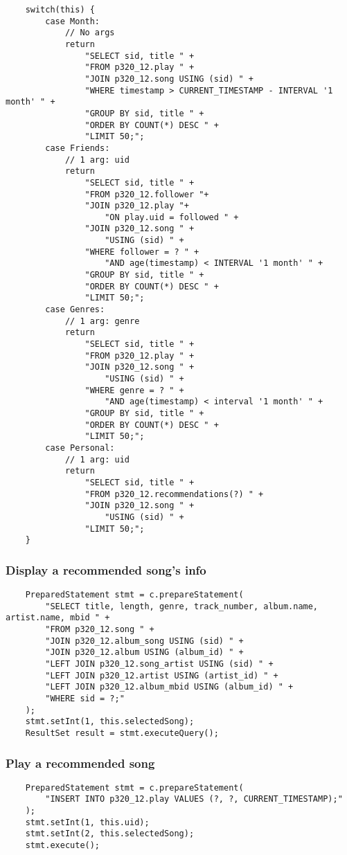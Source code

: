 \documentclass[12pt]{article}
\begin{document}
    \begin{lstlisting}
    switch(this) {
        case Month:
            // No args
            return
                "SELECT sid, title " +
                "FROM p320_12.play " +
                "JOIN p320_12.song USING (sid) " +
                "WHERE timestamp > CURRENT_TIMESTAMP - INTERVAL '1 month' " +
                "GROUP BY sid, title " +
                "ORDER BY COUNT(*) DESC " +
                "LIMIT 50;";
        case Friends:
            // 1 arg: uid
            return
                "SELECT sid, title " +
                "FROM p320_12.follower "+
                "JOIN p320_12.play "+
                    "ON play.uid = followed " +
                "JOIN p320_12.song " +
                    "USING (sid) " +
                "WHERE follower = ? " +
                    "AND age(timestamp) < INTERVAL '1 month' " +
                "GROUP BY sid, title " +
                "ORDER BY COUNT(*) DESC " +
                "LIMIT 50;";
        case Genres:
            // 1 arg: genre
            return
                "SELECT sid, title " +
                "FROM p320_12.play " +
                "JOIN p320_12.song " +
                    "USING (sid) " +
                "WHERE genre = ? " +
                    "AND age(timestamp) < interval '1 month' " +
                "GROUP BY sid, title " +
                "ORDER BY COUNT(*) DESC " +
                "LIMIT 50;";
        case Personal:
            // 1 arg: uid
            return
                "SELECT sid, title " +
                "FROM p320_12.recommendations(?) " +
                "JOIN p320_12.song " +
                    "USING (sid) " +
                "LIMIT 50;";
    }
    \end{lstlisting}

    \subsubsection{Display a recommended song's info}

    \begin{lstlisting}
    PreparedStatement stmt = c.prepareStatement(
        "SELECT title, length, genre, track_number, album.name, artist.name, mbid " +
        "FROM p320_12.song " +
        "JOIN p320_12.album_song USING (sid) " +
        "JOIN p320_12.album USING (album_id) " +
        "LEFT JOIN p320_12.song_artist USING (sid) " +
        "LEFT JOIN p320_12.artist USING (artist_id) " +
        "LEFT JOIN p320_12.album_mbid USING (album_id) " +
        "WHERE sid = ?;"
    );
    stmt.setInt(1, this.selectedSong);
    ResultSet result = stmt.executeQuery();
    \end{lstlisting}


    \subsubsection{Play a recommended song}

    \begin{lstlisting}
    PreparedStatement stmt = c.prepareStatement(
        "INSERT INTO p320_12.play VALUES (?, ?, CURRENT_TIMESTAMP);"
    );
    stmt.setInt(1, this.uid);
    stmt.setInt(2, this.selectedSong);
    stmt.execute();
    \end{lstlisting}
\end{document}
